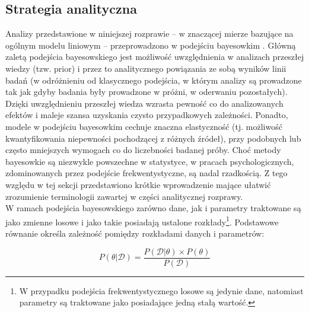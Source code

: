 \documentclass[man]{apa6}
\begin{document}
\subsection{Strategia analityczna}
Analizy przedstawione w niniejszej rozprawie -- w znaczącej mierze bazujące na ogólnym modelu liniowym -- przeprowadzono w podejściu bayesowkim \parencite[zob. np.,][]{gelman2014bayesian,gill2014bayesian, kruschke2014doing}. Główną zaletą podejścia bayesowskiego jest możliwość uwzględnienia w analizach przeszłej wiedzy (tzw. prior) i przez to analitycznego powiązania ze sobą wyników linii badań (w odróżnieniu od klasycznego podejścia, w którym analizy są prowadzone tak jak gdyby badania były prowadzone w próżni, w oderwaniu pozostałych). Dzięki uwzględnieniu przeszłej wiedza wzrasta pewność co do analizowanych efektów i maleje szansa uzyskania czysto przypadkowych zależności. Ponadto, modele w podejściu bayesowkim cechuje znaczna elastyczność (tj. możliwość kwantyfikowania niepewności pochodzącej z różnych źródeł), przy podobnych lub często mniejszych wymogach co do liczebności badanej próby. Choć metody bayesowkie są niezwykle powszechne w statystyce, w pracach psychologicznych, zdominowanych przez podejście frekwentystyczne, są nadal rzadkością. Z tego względu w tej sekcji przedstawiono krótkie wprowadzenie mające ułatwić zrozumienie terminologii zawartej w części analitycznej rozprawy.\\

W ramach podejścia bayesowskiego zarówno dane, jak i parametry traktowane są jako zmienne losowe i jako takie posiadają ustalone rozkłady\footnote{W przypadku podejścia frekwentystycznego losowe są jedynie dane, natomiast parametry są traktowane jako posiadające jedną stałą wartość.}. Podstawowe równanie określa zależność pomiędzy rozkładami danych i parametrów:

\begin{equation}\label{eq:bayes}
    P(\theta | \mathcal{D}) =
    \frac{P(\mathcal{D} | \theta)\times P(\theta)}
    {P(\mathcal{D})}
\end{equation}
\end{document}
